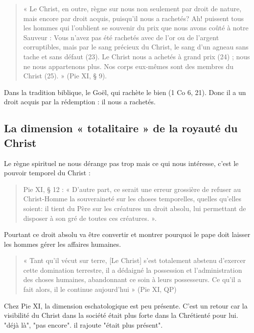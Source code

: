 \begin{quote}
    « Le Christ, en outre, règne sur nous non seulement par droit de nature, mais encore par droit acquis, puisqu'il nous a rachetés? Ah! puissent tous les hommes qui l'oublient se souvenir du prix que nous avons coûté à notre Sauveur : Vous n'avez pas été rachetés avec de l'or ou de l'argent corruptibles, mais par le sang précieux du Christ, le sang d'un agneau sans tache et sans défaut (23). Le Christ nous a achetés à grand prix (24) ; nous ne nous appartenons plus. Nos corps eux-mêmes sont des membres du Christ (25). » (Pie XI, § 9). 
\end{quote}

Dans la tradition biblique, le Goël, qui rachète le bien (1 Co 6, 21). Donc il a un droit acquis par la rédemption : il nous a rachetés.




\subsection{La dimension « totalitaire » de la royauté du Christ }

Le règne spirituel ne nous dérange pas trop mais ce qui nous intéresse, c'est le pouvoir temporel du Christ : 

\begin{quote}
    Pie XI, § 12 : « D'autre part, ce serait une erreur grossière de refuser au Christ-Homme la souveraineté sur les choses temporelles, quelles qu'elles soient: il tient du Père sur les créatures un droit absolu, lui permettant de disposer à son gré de toutes ces créatures. ».  
\end{quote}

Pourtant ce droit absolu va être convertir et montrer pourquoi le pape doit laisser les hommes gérer les affaires humaines.
\begin{quote}
    « Tant qu'il vécut sur terre, [Le Christ] s'est totalement abstenu d'exercer cette domination terrestre, il a dédaigné la possession et l'administration des choses humaines, abandonnant ce soin à leurs possesseurs. Ce qu'il a fait alors, il le continue aujourd'hui » (Pie XI, QP) 
\end{quote}

\begin{Synthesis}
Chez Pie XI, la dimension eschatologique est peu présente. C'est un retour car la visibilité du Christ dans la société était plus forte dans la Chrétienté pour lui. 
"déjà là", "pas encore". il rajoute "était plus présent".
\end{Synthesis}

